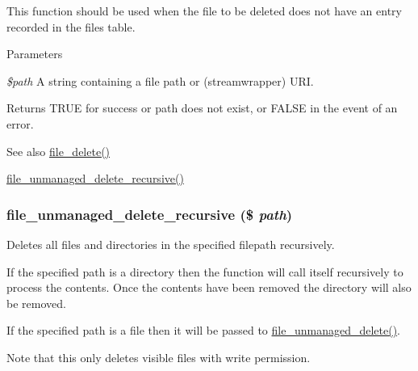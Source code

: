 This function should be used when the file to be deleted does not have an entry recorded in the files table.


\begin{DoxyParams}{Parameters}
\item[{\em \$path}]A string containing a file path or (streamwrapper) URI.\end{DoxyParams}
\begin{DoxyReturn}{Returns}
TRUE for success or path does not exist, or FALSE in the event of an error.
\end{DoxyReturn}
\begin{DoxySeeAlso}{See also}
\hyperlink{group__file_gac7503f0dcdea965d68e4a242e7760921}{file\_\-delete()} 

\hyperlink{group__file_gaf5c2cffaaf70f0f62a513f033d814899}{file\_\-unmanaged\_\-delete\_\-recursive()} 
\end{DoxySeeAlso}
\hypertarget{group__file_gaf5c2cffaaf70f0f62a513f033d814899}{
\subsubsection[{file\_\-unmanaged\_\-delete\_\-recursive}]{\setlength{\rightskip}{0pt plus 5cm}file\_\-unmanaged\_\-delete\_\-recursive (\$ {\em path})}}
\label{group__file_gaf5c2cffaaf70f0f62a513f033d814899}
Deletes all files and directories in the specified filepath recursively.

If the specified path is a directory then the function will call itself recursively to process the contents. Once the contents have been removed the directory will also be removed.

If the specified path is a file then it will be passed to \hyperlink{group__file_ga336a7e83da1397131e665d1c6e97fc83}{file\_\-unmanaged\_\-delete()}.

Note that this only deletes visible files with write permission.


